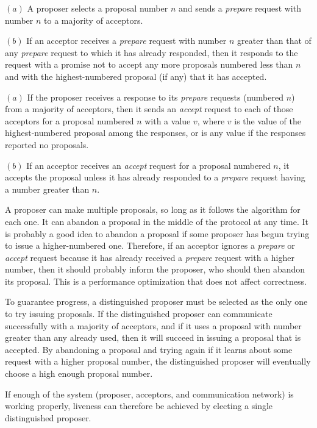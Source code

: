 \begin{phase}
    $(a)$ A proposer selects a proposal number $n$ and sends a \emph{prepare} request with number $n$ to a majority of acceptors.
    
    $(b)$ If an acceptor receives a \emph{prepare} request with number $n$ greater than that of any \emph{prepare} request to which it has already responded, then it responds to the request with a promise not to accept any more proposals numbered less than $n$ and with the highest-numbered proposal (if any) that it has accepted.
\end{phase}

\begin{phase}
    $(a)$ If the proposer receives a response to its \emph{prepare} requests (numbered $n$) from a majority of acceptors, then it sends an \emph{accept} request to each of those acceptors for a proposal numbered $n$ with a value $v$, where $v$ is the value of the highest-numbered proposal among the responses, or is any value if the responses reported no proposals.

    $(b)$ If an acceptor receives an \emph{accept} request for a proposal numbered $n$, it accepts the proposal unless it has already responded to a \emph{prepare} request having a number greater than $n$.
\end{phase}

A proposer can make multiple proposals, so long as it follows the algorithm for each one.
It can abandon a proposal in the middle of the protocol at any time.
It is probably a good idea to abandon a proposal if some proposer has begun trying to issue a higher-numbered one.
Therefore, if an acceptor ignores a \emph{prepare} or \emph{accept} request because it has already received a \emph{prepare} request with a higher number, then it should probably inform the proposer, who should then abandon its proposal.
This is a performance optimization that does not affect correctness.

To guarantee progress, a distinguished proposer must be selected as the only one to try issuing proposals.
If the distinguished proposer can communicate successfully with a majority of acceptors, and if it uses a proposal with number greater than any already used, then it will succeed in issuing a proposal that is accepted.
By abandoning a proposal and trying again if it learns about some request with a higher proposal number, the distinguished proposer will eventually choose a high enough proposal number.

If enough of the system (proposer, acceptors, and communication network) is working properly, liveness can therefore be achieved by electing a single distinguished proposer.

